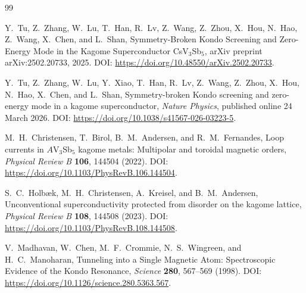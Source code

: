 \documentclass[11pt]{article}
\begin{document}
            \begin{thebibliography}{99}

                Y.~Tu, Z.~Zhang, W.~Lu, T.~Han, R.~Lv, Z.~Wang, Z.~Zhou, X.~Hou, N.~Hao, Z.~Wang, X.~Chen, and L.~Shan,
                \newblock Symmetry-Broken Kondo Screening and Zero-Energy Mode in the Kagome Superconductor CsV$_3$Sb$_5$,
                \newblock arXiv preprint arXiv:2502.20733, 2025.
                \newblock DOI: \url{https://doi.org/10.48550/arXiv.2502.20733}.

                Y.~Tu, Z.~Zhang, W.~Lu, Y.~Xiao, T.~Han, R.~Lv, Z.~Wang, Z.~Zhou, X.~Hou, N.~Hao, X.~Chen, and L.~Shan,
                \newblock Symmetry-broken Kondo screening and zero-energy mode in a kagome superconductor,
                \newblock \emph{Nature Physics}, published online 24 March 2026.
                \newblock DOI: \url{https://doi.org/10.1038/s41567-026-03223-5}.

                M.~H.~Christensen, T.~Birol, B.~M.~Andersen, and R.~M.~Fernandes,
                \newblock Loop currents in $A$V$_3$Sb$_5$ kagome metals: Multipolar and toroidal magnetic orders,
                \newblock \emph{Physical Review B} \textbf{106}, 144504 (2022).
                \newblock DOI: \url{https://doi.org/10.1103/PhysRevB.106.144504}.

                S.~C.~Holb{\ae}k, M.~H.~Christensen, A.~Kreisel, and B.~M.~Andersen,
                \newblock Unconventional superconductivity protected from disorder on the kagome lattice,
                \newblock \emph{Physical Review B} \textbf{108}, 144508 (2023).
                \newblock DOI: \url{https://doi.org/10.1103/PhysRevB.108.144508}.

                V.~Madhavan, W.~Chen, M.~F.~Crommie, N.~S.~Wingreen, and H.~C.~Manoharan,
                \newblock Tunneling into a Single Magnetic Atom: Spectroscopic Evidence of the Kondo Resonance,
                \newblock \emph{Science} \textbf{280}, 567--569 (1998).
                \newblock DOI: \url{https://doi.org/10.1126/science.280.5363.567}.

            \end{thebibliography}
\end{document}

